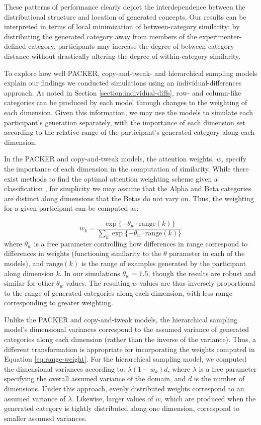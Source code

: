 \documentclass[12pt]{article}
\begin{document}
\begin{flushleft}
These patterns of performance clearly depict the interdependence between the distributional structure and location of generated concepts. Our results can be interpreted in terms of local minimization of between-category similarity: by distributing the generated category away from members of the experimenter-defined category, participants may increase the degree of between-category distance without drastically altering the degree of within-category similarity.

To explore how well PACKER, copy-and-tweak- and hierarchical sampling models explain our findings we conducted simulations using an individual-differences approach. As noted in Section \ref{section:individual-diffs}, row- and column-like categories can be produced by each model through changes to the weighting of each dimension. Given this information, we may use the models to simulate each participant's generation separately, with the importance of each dimension set according to the relative range of the participant's generated category along each dimension. 

In the PACKER and copy-and-tweak models, the attention weights, $w$, specify the importance of each dimension in the computation of similarity. While there exist methods to find the optimal attention weighting scheme given a classification \citep[see][]{vanpaemel2012using}, for simplicity we may assume that the Alpha and Beta categories are distinct along dimensions that the Betas do not vary on. Thus, the weighting for a given participant can be computed as:

\begin{equation}
w_k = \dfrac
{\exp{ \{ -\theta_w \cdot\text{range}(k)}  \} } 
{ \sum_k {\exp{ \{ -\theta_w \cdot\text{range}(k)}  \} } }
\label{eq:range-weight}
\end{equation}
% 
where $\theta_w$ is a free parameter controlling how differences in range correspond to differences in weights (functioning similarity to the $\theta$ parameter in each of the models), and $\text{range}(k)$ is the range of examples generated by the participant along dimension $k$. In our simulations $\theta_w = 1.5$, though the results are robust and similar for other $\theta_w$ values. The resulting $w$ values are thus inversely proportional to the range of generated categories along each dimension, with less range corresponding to greater weighting.

Unlike the PACKER and copy-and-tweak models, the hierarchical sampling model's dimensional variances correspond to the assumed variance of generated categories along each dimension (rather than the inverse of the variance). Thus, a different transformation is appropriate for incorporating the weights computed in Equation \ref{eq:range-weight}. For the hierarchical sampling model, we computed the dimensional variances according to: $\lambda (1-w_k)d$, where $\lambda$ is a free parameter specifying the overall assumed variance of the domain, and $d$ is the number of dimensions. Under this approach, evenly distributed weights correspond to an assumed variance of $\lambda$. Likewise, larger values of $w$, which are produced when the generated category is tightly distributed along one dimension, correspond to smaller assumed variances. 


\end{flushleft}
\end{document}

